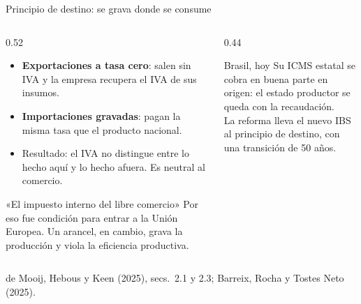 \documentclass[aspectratio=169,11pt]{beamer}
\newcommand{\fuente}[1]{\par\vfill{\small\color{cGris}#1\par}}
\begin{document}
\begin{frame}{Principio de destino: se grava donde se consume}
  \begin{columns}[T]
    \begin{column}{0.52\textwidth}
      \begin{itemize}
        \item \textbf{Exportaciones a tasa cero}: salen sin IVA y la empresa recupera el IVA de sus insumos.
        \item \textbf{Importaciones gravadas}: pagan la misma tasa que el producto nacional.
        \item Resultado: el IVA no distingue entre lo hecho aquí y lo hecho afuera. Es neutral al comercio.
      \end{itemize}
      \pause
      \begin{block}{«El impuesto interno del libre comercio»}
        Por eso fue condición para entrar a la Unión Europea. Un arancel, en cambio, grava la producción y viola la eficiencia productiva.
      \end{block}
    \end{column}
    \begin{column}{0.44\textwidth}
      \pause
      \begin{block}{Brasil, hoy}
        Su ICMS estatal se cobra en buena parte en origen: el estado productor se queda con la recaudación.\\[3pt]
        La reforma lleva el nuevo IBS al principio de destino, con una transición de 50 años.
      \end{block}
    \end{column}
  \end{columns}
  \fuente{de Mooij, Hebous y Keen (2025), secs.~2.1 y 2.3; Barreix, Rocha y Tostes Neto (2025).}
\end{frame}
\end{document}
